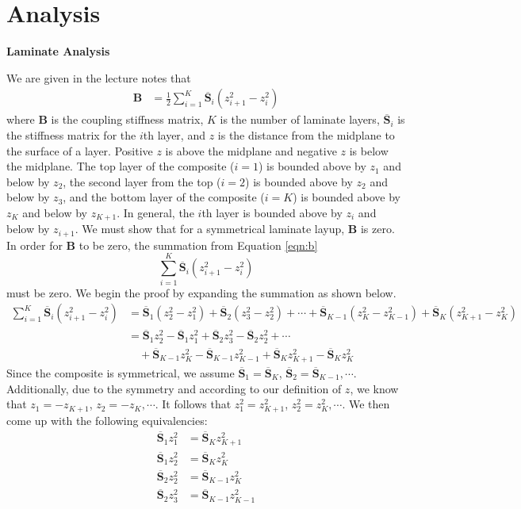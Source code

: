 \documentclass[12 pt]{article}
\begin{document}
\section{Analysis} \label{analysis}
\textbf{Laminate Analysis}

We are given in the lecture notes that
\begin{align} \label{eqn:b}
	\textbf{B}&=\frac{1}{2}\sum_{i=1}^K\overline{\textbf{S}}_i(z_{i+1}^2-z_i^2)
\end{align}
where \textbf{B} is the coupling stiffness matrix, $K$ is the number of laminate layers, $\overline{\textbf{S}}_i$ is the stiffness matrix for the $i$th layer, and $z$ is the distance from the midplane to the surface of a layer. Positive $z$ is above the midplane and negative $z$ is below the midplane. The top layer of the composite ($i=1$) is bounded above by $z_1$ and below by $z_2$, the second layer from the top ($i=2$) is bounded above by $z_2$ and below by $z_3$, and the bottom layer of the composite ($i=K$) is bounded above by $z_K$ and below by $z_{K+1}$. In general, the $i$th layer is bounded above by $z_i$ and below by $z_{i+1}$. We must show that for a symmetrical laminate layup, \textbf{B} is zero. In order for \textbf{B} to be zero, the summation from Equation \ref{eqn:b}
\[\sum_{i=1}^K\overline{\textbf{S}}_i(z_{i+1}^2-z_i^2)\]
must be zero. We begin the proof by expanding the summation as shown below.
\begin{align*}
	\sum_{i=1}^K\overline{\textbf{S}}_i(z_{i+1}^2-z_i^2)&=\overline{\textbf{S}}_1(z_2^2-z_1^2)+\overline{\textbf{S}}_2(z_3^2-z_2^2)+\cdots+\overline{\textbf{S}}_{K-1}(z_K^2-z_{K-1}^2)+\overline{\textbf{S}}_K(z_{K+1}^2-z_K^2)\\
	&=\overline{\textbf{S}}_1z_2^2-\overline{\textbf{S}}_1z_1^2+\overline{\textbf{S}}_2z_3^2-\overline{\textbf{S}}_2z_2^2+\cdots\\
	&\quad+\overline{\textbf{S}}_{K-1}z_K^2-\overline{\textbf{S}}_{K-1}z_{K-1}^2+\overline{\textbf{S}}_Kz_{K+1}^2-\overline{\textbf{S}}_Kz_K^2
\end{align*}
Since the composite is symmetrical, we assume $\overline{\textbf{S}}_1=\overline{\textbf{S}}_K$, $\overline{\textbf{S}}_2=\overline{\textbf{S}}_{K-1},\cdots$. Additionally, due to the symmetry and according to our definition of $z$, we know that $z_1=-z_{K+1}$, $z_2=-z_{K},\cdots$. It follows that $z_1^2=z_{K+1}^2$, $z_2^2=z_K^2,\cdots$. We then come up with the following equivalencies:
\begin{align*}
	\overline{\textbf{S}}_1z_1^2&=\overline{\textbf{S}}_Kz_{K+1}^2\\
	\overline{\textbf{S}}_1z_2^2&=\overline{\textbf{S}}_Kz_K^2\\
	\overline{\textbf{S}}_2z_2^2&=\overline{\textbf{S}}_{K-1}z_K^2\\
	\overline{\textbf{S}}_2z_3^2&=\overline{\textbf{S}}_{K-1}z_{K-1}^2
\end{align*}
\end{document}
